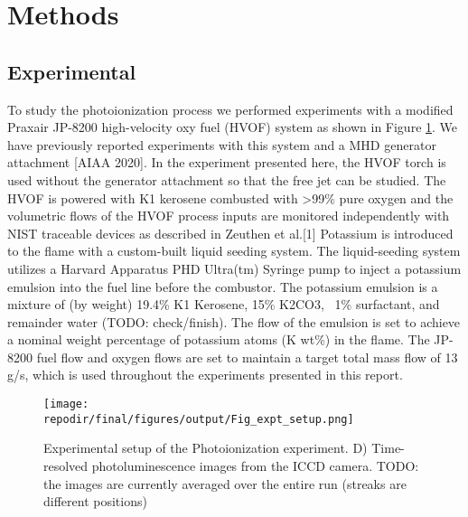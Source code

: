 \section{Methods}


\subsection{Experimental}

To study the photoionization process we performed experiments with a modified Praxair JP-8200 high-velocity oxy fuel (HVOF) system as shown in Figure \ref{fig:expt_setup}. We have previously reported experiments with this system and a MHD generator attachment [AIAA 2020]. In the experiment presented here, the HVOF torch is used without the generator attachment so that the free jet can be studied.  The HVOF is powered with K1 kerosene combusted with >99\% pure oxygen and the volumetric flows of the HVOF process inputs are monitored independently with NIST traceable devices as described in Zeuthen et al.[1] Potassium is introduced to the flame with a custom-built liquid seeding system. The liquid-seeding system utilizes a Harvard Apparatus PHD Ultra(tm) Syringe pump to inject a potassium emulsion into the fuel line before the combustor. The potassium emulsion is a mixture of (by weight) 19.4\% K1 Kerosene, 15\% K2CO3,  ~1\% surfactant, and remainder water (TODO: check/finish). The flow of the emulsion is set to achieve a nominal weight percentage of potassium atoms (K wt\%) in the flame. The JP-8200 fuel flow and oxygen flows are set to maintain a target total mass flow of 13 g/s, which is used throughout the experiments presented in this report.
\begin{figure}[h]
    \texttt{[image: \\repodir/final/figures/output/Fig\_expt\_setup.png]} 
    \caption{Experimental setup of the Photoionization experiment. D) Time-resolved photoluminescence images from the ICCD camera. TODO: the images are currently averaged over the entire run (streaks are different positions) }
    \label{fig:expt_setup}
\end{figure}

